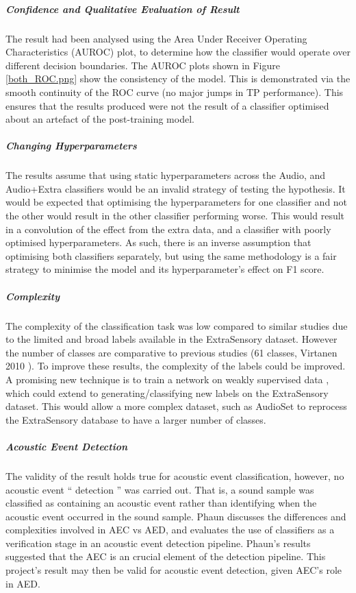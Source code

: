 \documentclass{UoNMCHA}
\newcommand{\inlineQuote}[1]{`` #1 ''}
\newcommand{\fref}[1] {Figure \ref{#1}}
\numberwithin{equation}{section}
\begin{document}
\subparagraph{Confidence and Qualitative Evaluation of Result}
The result had been analysed using the Area Under Receiver Operating Characteristics (AUROC) plot, to determine how the classifier would operate over different decision boundaries. The AUROC plots shown in \fref{both_ROC.png} show the consistency of the model. This is demonstrated via the smooth continuity of the ROC curve (no major jumps in TP performance). This ensures that the results produced were not the result of a classifier optimised about an artefact of the post-training model.

\subparagraph{Changing Hyperparameters}
The results assume that using static hyperparameters across the Audio, and Audio+Extra classifiers would be an invalid strategy of testing the hypothesis. It would be expected that optimising the hyperparameters for one classifier and not the other would result in the other classifier performing worse. This would result in a convolution of the effect from the extra data, and a classifier with poorly optimised hyperparameters. As such, there is an inverse assumption that optimising both classifiers separately, but using the same methodology is a fair strategy to minimise the model and its hyperparameter's effect on F1 score.

\subparagraph{Complexity} 
The complexity of the classification task was low compared to similar studies \cite{Tseng2017}\cite{Virtanen2010} due to the limited and broad labels available in the ExtraSensory dataset. However the number of classes are comparative to previous studies (61 classes, Virtanen 2010 \cite{Virtanen2010}). To improve these results, the complexity of the labels could be improved. A promising new technique is to train a network on weakly supervised data \cite{Tseng2017}, which could extend to generating/classifying new labels on the ExtraSensory dataset. This would allow a more complex dataset, such as AudioSet \cite{Audiosetgoogle2018} to reprocess the ExtraSensory database to have a larger number of classes.



\subparagraph{Acoustic Event Detection}
The validity of the result holds true for acoustic event classification, however, no acoustic event \inlineQuote{detection} was carried out. That is, a sound sample was classified as containing an acoustic event rather than identifying when the acoustic event occurred in the sound sample. Phaun \cite{Phan2016} discusses the differences and complexities involved in AEC vs AED, and evaluates the use of classifiers as a verification stage in an acoustic event detection pipeline. %
Phaun's results suggested that the AEC is an crucial element of the detection pipeline. This project's result may then be valid for acoustic event detection, given AEC's role in AED.
\end{document}
